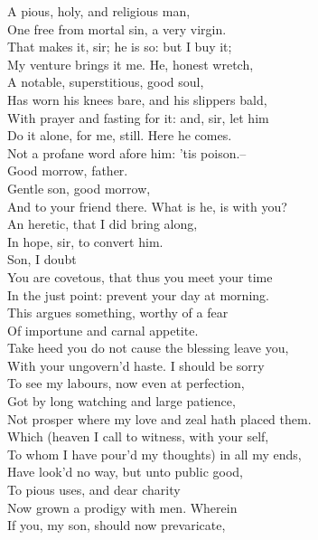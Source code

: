 \documentclass{memoir}
\begin{document}
\begin{drama*}
 A pious, holy, and religious man,\\
 One free from mortal sin, a very virgin.\\
\mammonspeaks  That makes it, sir; he is so: but I buy it;\\
 My venture brings it me. He, honest wretch,\\
 A notable, superstitious, good soul,\\
 Has worn his knees bare, and his slippers bald,\\
 With prayer and fasting for it: and, sir, let him\\
 Do it alone, for me, still. Here he comes.\\
 Not a profane word afore him: 'tis poison.--\\
 Good morrow, father.\\
\subtlespeaks {} Gentle son, good morrow,\\
 And to your friend there. What is he, is with you?\\
\mammonspeaks  An heretic, that I did bring along,\\
 In hope, sir, to convert him.\\
\subtlespeaks {} Son, I doubt\\
 You are covetous, that thus you meet your time\\
 In the just point: prevent your day at morning.\\
 This argues something, worthy of a fear\\
 Of importune and carnal appetite.\\
 Take heed you do not cause the blessing leave you,\\
 With your ungovern'd haste. I should be sorry\\
 To see my labours, now even at perfection,\\
 Got by long watching and large patience,\\
 Not prosper where my love and zeal hath placed them.\\
 Which (heaven I call to witness, with your self,\\
 To whom I have pour'd my thoughts) in all my ends,\\
 Have look'd no way, but unto public good,\\
 To pious uses, and dear charity\\
 Now grown a prodigy with men. Wherein\\
 If you, my son, should now prevaricate,\\

\end{drama*}
\end{document}

